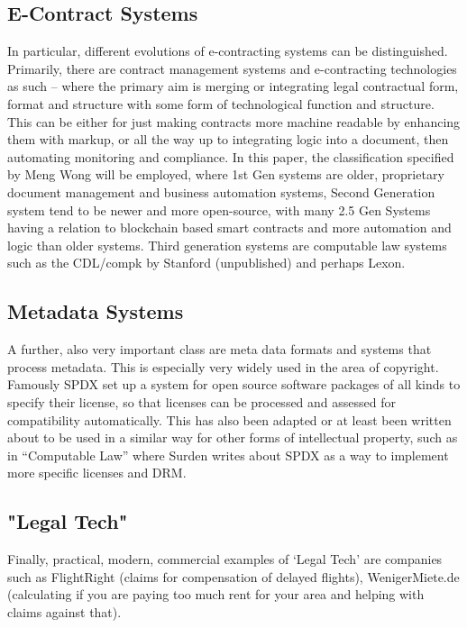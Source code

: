 \documentclass{article}
\begin{document}
\subsection{E-Contract Systems}
In particular, different evolutions of e-contracting systems can be distinguished. Primarily, there are contract management systems  and e-contracting technologies as such – where the primary aim is merging or integrating legal contractual form, format and structure with some form of technological function and structure. This can be either for just making contracts more machine readable by enhancing them with markup, or all the way up to integrating logic into a document, then automating monitoring and compliance.
In this paper, the classification specified by Meng Wong \cite{wongmengComputableContractsAcademia2018} %
will be employed, where 1st Gen systems are older, proprietary document management and business automation systems,  Second Generation system tend to be newer and more open-source, with many 2.5 Gen Systems having a relation to blockchain based smart contracts and more automation and logic than older systems. Third generation systems are computable law systems such as the CDL/compk  by Stanford (unpublished) \cite{ComputableContracts} and perhaps Lexon. %

\subsection{Metadata Systems}
A further, also very important class are meta data formats and systems that process metadata. This is especially very widely used in the area of copyright. Famously SPDX \cite{odenceAdvancingSoftwarePackage2013}  set up a system for open source software packages of all kinds to specify their license, so that licenses can be processed and assessed for compatibility automatically. This has also been adapted or at least been written about to be used in a similar way for other forms of intellectual property, such as in “Computable Law” where Surden writes about SPDX as a way to implement more specific licenses and DRM. \cite{surdenComputableContracts2012}

\subsection{"Legal Tech"}
Finally, practical, modern, commercial examples of ‘Legal Tech’ are companies such as FlightRight  (claims for compensation of delayed flights), WenigerMiete.de  (calculating if you are paying too much rent for your area and helping with claims against that). \cite{ambrogiGoldenAgeLegal2017}
\end{document}
